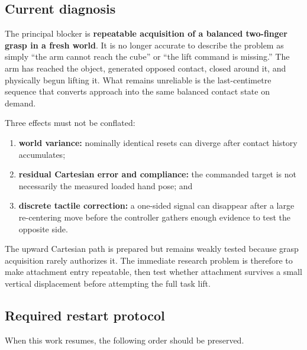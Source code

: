 \subsection{Current diagnosis}

The principal blocker is \textbf{repeatable acquisition of a balanced
two-finger grasp in a fresh world}.  It is no longer accurate to describe the
problem as simply ``the arm cannot reach the cube'' or ``the lift command is
missing.''  The arm has reached the object, generated opposed contact, closed
around it, and physically begun lifting it.  What remains unreliable is the
last-centimetre sequence that converts approach into the same balanced contact
state on demand.

Three effects must not be conflated:
\begin{enumerate}
  \item \textbf{world variance:} nominally identical resets can diverge after
        contact history accumulates;
  \item \textbf{residual Cartesian error and compliance:} the commanded target
        is not necessarily the measured loaded hand pose; and
  \item \textbf{discrete tactile correction:} a one-sided signal can disappear
        after a large re-centering move before the controller gathers enough
        evidence to test the opposite side.
\end{enumerate}

The upward Cartesian path is prepared but remains weakly tested because grasp
acquisition rarely authorizes it.  The immediate research problem is therefore
to make attachment entry repeatable, then test whether attachment survives a
small vertical displacement before attempting the full task lift.

\subsection{Required restart protocol}
\label{subsec:cube-lift-restart-protocol}

When this work resumes, the following order should be preserved.

